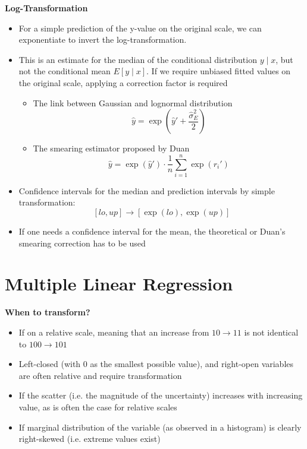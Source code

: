 \documentclass[a4paper]{article}
\begin{document}
\textbf{Log-Transformation}
\begin{itemize}
    \item For a simple prediction of the y-value on the original scale, we can exponentiate to invert the log-transformation.
    \item This is an estimate for the median of the conditional distribution $y\mid x$, but not the conditional mean $E[y\mid x]$. If we require unbiased fitted values on the original scale, applying a correction factor is required
    \begin{itemize}
        \item The link between Gaussian and lognormal distribution
        \[\hat{y}=\exp(\hat{y}'+\frac{\hat{\sigma}_E^2}{2}) \]
        \item The smearing estimator proposed by Duan
        \[\hat{y}=\exp(\hat{y}')\cdot\frac{1}{n}\sum_{i=1}^n\exp(r_i') \]
    \end{itemize}
    \item Confidence intervals for the median and prediction intervals by simple transformation:
    \[[lo, up]\to [\exp(lo), \exp(up)] \]
    \item If one needs a confidence interval for the mean, the theoretical or Duan's smearing correction has to be used
\end{itemize}



\section{Multiple Linear Regression}


\textbf{When to transform?}
\begin{itemize}
    \item If on a relative scale, meaning that an increase from $10\to11$ is not identical to $100\to101$
    \item Left-closed (with 0 as the smallest possible value), and right-open variables are often relative and require transformation
    \item If the scatter (i.e. the magnitude of the uncertainty) increases with increasing value, as is often the case for relative scales
    \item If marginal distribution of the variable (as observed in a histogram) is clearly right-skewed (i.e. extreme values exist)
\end{itemize}
\end{document}
